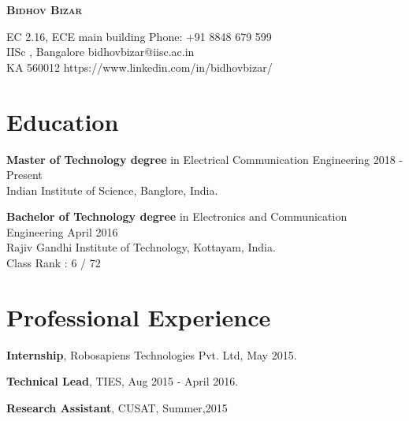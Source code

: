\documentclass[10pt]{article}
\begin{document}
\begin{center}
\begin{LARGE}
\textsc{\textbf{Bidhov Bizar}}\\[3mm]
\end{LARGE}
\end{center}

\noindent
EC 2.16, ECE main building
\hfill Phone: +91 8848 679 599 \\
IISc , Bangalore
\hfill bidhovbizar@iisc.ac.in\\
KA 560012
\hfill https://www.linkedin.com/in/bidhovbizar/


\section*{Education}
\begin{shortlist}
\item \textbf{Master of Technology degree} in Electrical Communication Engineering \hfill 2018 - Present \\
{Indian Institute of Science}, Banglore, India.

\item \textbf{Bachelor of Technology degree} in Electronics and Communication Engineering \hfill April 2016\\
{Rajiv Gandhi Institute of Technology}, Kottayam, India.\\
Class Rank : 6 / 72

\end{shortlist}

\section*{Professional Experience}
\begin{shortlist}
\item \textbf{Internship}, Robosapiens Technologies Pvt. Ltd, May 2015.
\item \textbf{Technical Lead}, TIES, Aug 2015 - April 2016.
\item \textbf{Research Assistant}, CUSAT, Summer,2015
\end{shortlist}
\end{document}
